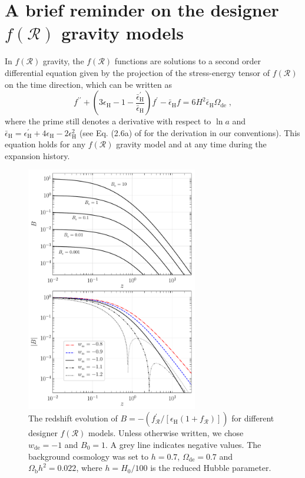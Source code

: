 \documentclass[nofootinbib,a4paper,aps,prd,10pt,superscriptaddress,reprint,showkeys,showpacs]{revtex4-1}
\newcommand{\qsubrm}[2]{{#1}_{\scriptscriptstyle{\textrm{#2}}}}
\def\be{\begin{equation}}
\def\ee{\end{equation}}
\begin{document}
\section{A brief reminder on the designer \texorpdfstring{$f(\mathcal{R})$}{f(R)} gravity models}\label{sect:fR}
In $f(\mathcal R)$ gravity, the $f(\mathcal R)$ functions are solutions to a second order differential equation given 
by the projection of the stress-energy tensor of $f(\mathcal{R})$ on the time direction, which can be written as 
\citep{Song2007,Pogosian2008,Nojiri2009,Dunsby2010,Lombriser2012}
\be\label{eqn:fR}
 f^{\prime\prime} + 
 \left(3\epsilon_{{\scriptscriptstyle \mathrm{H}}}-1-
 \frac{\bar{\epsilon}_{{\scriptscriptstyle\mathrm{H}}}^{\prime}}
 {\bar{\epsilon}_{{\scriptscriptstyle\mathrm{H}}}}\right) f^{\prime} - 
 \bar{\epsilon}_{{\scriptscriptstyle\mathrm{H}}}f = 
 6H^{2}\bar{\epsilon}_{{\scriptscriptstyle\mathrm{H}}}\Omega_{{\scriptscriptstyle \mathrm{de}}}\;,
\ee
where the prime still denotes a derivative with respect to $\ln{a}$ and 
$\bar{\epsilon}_{{\scriptscriptstyle \mathrm{H}}} = 
{\epsilon}_{{\scriptscriptstyle\mathrm{H}}}^\prime + 4\epsilon_{{\scriptscriptstyle \mathrm{H}}} - 
2\epsilon_{{\scriptscriptstyle\mathrm{H}}}^{2}$ (see Eq. (2.6a) of \citep{Battye2016a} for the derivation in our 
conventions). This equation holds for any $f(\mathcal{R})$ gravity model and at any time during the expansion history.
\begin{figure}
 \begin{center}
  \includegraphics[width=7.5cm,angle=0]{fig1.pdf}
  \caption[justified]{The redshift evolution of 
  $B=-({f_{\mathcal{R}}^{\prime}}/[{\qsubrm{\epsilon}{H}(1+f_{\mathcal{R}})}])$ for different designer $f(\mathcal{R})$ 
  models. Unless otherwise written, we chose $\qsubrm{w}{de}=-1$ and $\qsubrm{B}{0}=1$. A grey line indicates negative 
  values. The background cosmology was set to $h=0.7$, $\qsubrm{\Omega}{de}=0.7$ and $\qsubrm{\Omega}{b}h^2=0.022$, 
  where $h=H_0/100$ is the reduced Hubble parameter.}
  \label{fig:bgfr}
 \end{center}
\end{figure}
\end{document}
